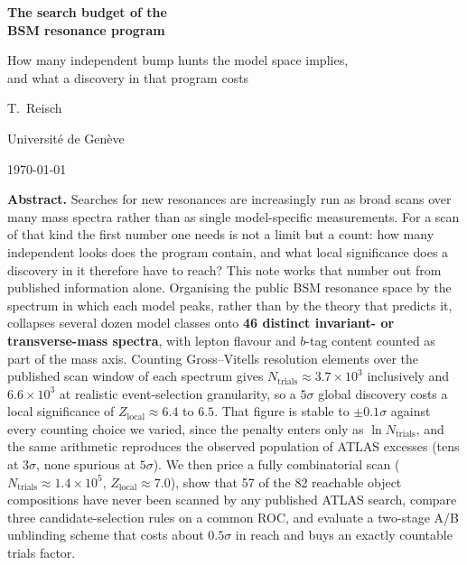 \documentclass[11pt,a4paper]{article}
\newcommand{\Nsig}{N_{\mathrm{trials}}}
\newcommand{\Zloc}{Z_{\mathrm{local}}}
\begin{document}
\begin{titlepage}
\begin{center}
\vspace*{18mm}

{\LARGE\bfseries The search budget of the\\[2mm]
 BSM resonance program\par}
\vspace{8mm}
{\large How many independent bump hunts the model space implies,\\
 and what a discovery in that program costs\par}
\vspace{16mm}

{\large T.\ Reisch\par}
{\normalsize Universit\'e de Gen\`eve\par}
\vspace{4mm}
{\normalsize \today\par}
\vspace{18mm}

\begin{minipage}{0.86\textwidth}
\small
\textbf{Abstract.} Searches for new resonances are increasingly run as broad scans over many mass
spectra rather than as single model-specific measurements. For a scan of that kind the first number
one needs is not a limit but a count: how many independent looks does the program contain, and what
local significance does a discovery in it therefore have to reach? This note works that number out
from published information alone. Organising the public BSM resonance space by the spectrum in
which each model peaks, rather than by the theory that predicts it, collapses several dozen model
classes onto \textbf{46 distinct invariant- or transverse-mass spectra}, with lepton flavour and
$b$-tag content counted as part of the mass axis. Counting Gross--Vitells resolution elements over
the published scan window of each spectrum gives $\Nsig \approx 3.7\times10^{3}$ inclusively and
$6.6\times10^{3}$ at realistic event-selection granularity, so a $5\sigma$ global discovery costs a
local significance of $\Zloc \approx 6.4$ to $6.5$. That figure is stable to $\pm0.1\sigma$ against
every counting choice we varied, since the penalty enters only as $\ln \Nsig$, and the same
arithmetic reproduces the observed population of ATLAS excesses (tens at $3\sigma$, none spurious
at $5\sigma$). We then price a fully combinatorial scan ($\Nsig \approx 1.4\times10^{5}$, $\Zloc
\approx 7.0$), show that 57 of the 82 reachable object compositions have never been scanned by any
published ATLAS search, compare three candidate-selection rules on a common ROC, and evaluate a
two-stage A/B unblinding scheme that costs about $0.5\sigma$ in reach and buys an exactly countable
trials factor.
\end{minipage}
\end{center}
\end{titlepage}
\end{document}
